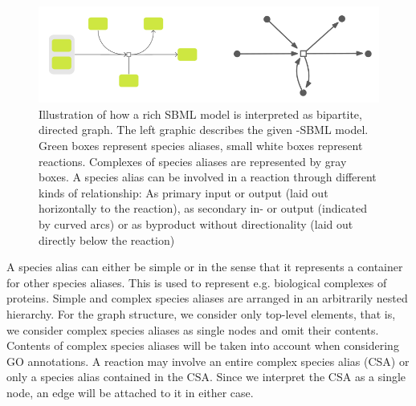 \documentclass[
	fontsize=10pt, %
	twoside=false, %
	secnumdepth=1, %
  toc=indentunnumbered %
]{kaobook}
\begin{document}
\begin{figure}[h]
  \centering
  \includegraphics[width=0.7\linewidth]{graph-interpretation.png}
  \caption[Illustration how a rich SBML model is interpreted as a
  graph.]{Illustration of how a rich SBML model is interpreted as bipartite,
    directed graph. The left graphic describes the given -SBML model. Green
    boxes represent species aliases, small white boxes represent reactions.
    Complexes of species aliases are represented by gray boxes. A species alias
    can be involved in a reaction through different kinds of relationship: As
    primary input or output (laid out horizontally to the reaction), as
    secondary in- or output (indicated by curved arcs) or as byproduct without
    directionality (laid out directly below the reaction)}
  \label{fig:graph-construction}
\end{figure}



A species alias can either be simple or  in the sense that it
represents a container for other species aliases. This is used to represent e.g.
biological complexes of proteins. Simple and complex species aliases are
arranged in an arbitrarily nested hierarchy. For the graph structure, we
consider only top-level elements, that is, we consider complex species aliases
as single nodes and omit their contents. Contents of complex species aliases
will be taken into account when considering GO annotations. A reaction may
involve an entire complex species alias (CSA) or only a species alias contained
in the CSA. Since we interpret the CSA as a single node, an edge will be
attached to it in either case.
\end{document}
